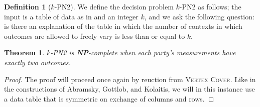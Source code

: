 \documentclass{amsart}
\newtheorem{thm}{Theorem}
\theoremstyle{definition}
\newtheorem{defn}{Definition}
\begin{document}
\begin{defn}[$k$-\textsc{PN2}]
We define the decision problem $k$-\textsc{PN2} as follows; the input is a table of data as in \cite{Mans2011} and an integer $k$, and we ask the following question: is there an explanation of the table in which the number of contexts in which outcomes are allowed to freely vary is less than or equal to $k$.
\end{defn}
\begin{thm}$k$-\textsc{PN2} is \textbf{NP}-complete when each party's measurements have exactly two outcomes.
\end{thm}
\begin{proof}
The proof will proceed once again by reuction from \textsc{Vertex Cover}. Like in the constructions of Abramsky, Gottlob, and Kolaitis, we will in this instance use a data table that is symmetric on exchange of columns and rows.


\end{proof}
\end{document}
